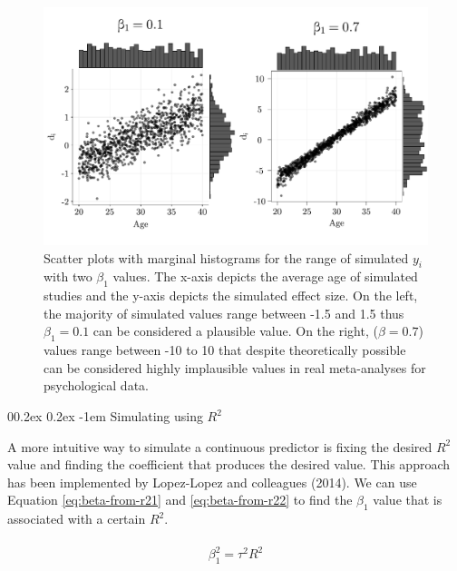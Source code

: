 \documentclass[
  man,floatsintext]{apa6}
\makeatletter
\let\oldparagraph\paragraph
\renewcommand{\paragraph}[1]{\oldparagraph{#1}\mbox{}}
\renewcommand{\paragraph}{\@startsection{paragraph}{4}{\parindent}%
  {0\baselineskip \@plus 0.2ex \@minus 0.2ex}%
  {-1em}%
  {\normalfont\normalsize\bfseries\itshape\typesectitle}}
\makeatother
\begin{document}
\normalsize

\scriptsize

\begin{figure}[H]

{\centering \includegraphics[width=0.8\linewidth]{paper_files/figure-latex/plot-meta-reg-plausible-implausible-1} 

}

\caption{\color{red} Scatter plots with marginal histograms for the range of simulated \(y_i\) with two \(\beta_1\) values. The x-axis depicts the average age of simulated studies and the y-axis depicts the simulated effect size. On the left, the majority of simulated values range between -1.5 and 1.5 thus \(\beta_1 = 0.1\) can be considered a plausible value. On the right, (\(\beta = 0.7\)) values range between -10 to 10 that despite theoretically possible can be considered highly implausible values in real meta-analyses for psychological data. \color{black}}\label{fig:plot-meta-reg-plausible-implausible}
\end{figure}

\normalsize

\hypertarget{simulating-using-r2}{%
\paragraph{\texorpdfstring{Simulating using \(R^2\)}{Simulating using R\^{}2}}\label{simulating-using-r2}}

A more intuitive way to simulate a continuous predictor is fixing the desired \(R^{2}\) value and finding the coefficient that produces the desired value. This approach has been implemented by Lopez-Lopez and colleagues (2014). We can use Equation \eqref{eq:beta-from-r21} and \eqref{eq:beta-from-r22} to find the \(\beta_{1}\) value that is associated with a certain \(R^{2}\).

\begin{align}
\begin{aligned}
\beta^2_1 = \tau^2R^2
\label{eq:beta-from-r21}
\end{aligned}
\end{align}
\end{document}
